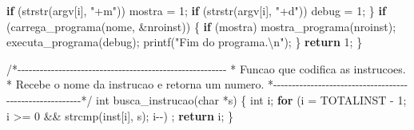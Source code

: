 \documentclass[
  brazilian,
  letterpaper,
]{book}
\newenvironment{Shaded}{\begin{snugshade}}{\end{snugshade}}
\newcommand{\CommentTok}[1]{\textcolor[rgb]{0.37,0.37,0.37}{#1}}
\newcommand{\ControlFlowTok}[1]{\textcolor[rgb]{0.00,0.23,0.31}{\textbf{#1}}}
\newcommand{\DataTypeTok}[1]{\textcolor[rgb]{0.68,0.00,0.00}{#1}}
\newcommand{\DecValTok}[1]{\textcolor[rgb]{0.68,0.00,0.00}{#1}}
\newcommand{\NormalTok}[1]{\textcolor[rgb]{0.00,0.23,0.31}{#1}}
\newcommand{\OperatorTok}[1]{\textcolor[rgb]{0.37,0.37,0.37}{#1}}
\newcommand{\SpecialCharTok}[1]{\textcolor[rgb]{0.37,0.37,0.37}{#1}}
\newcommand{\StringTok}[1]{\textcolor[rgb]{0.13,0.47,0.30}{#1}}
\theoremstyle{plain}
\theoremstyle{definition}
\theoremstyle{remark}
\begin{document}
\begin{Shaded}
\begin{Highlighting}[]
        \ControlFlowTok{if} \OperatorTok{(}\NormalTok{strstr}\OperatorTok{(}\NormalTok{argv}\OperatorTok{[}\NormalTok{i}\OperatorTok{],} \StringTok{"+m"}\OperatorTok{))}
\NormalTok{            mostra }\OperatorTok{=} \DecValTok{1}\OperatorTok{;}
        \ControlFlowTok{if} \OperatorTok{(}\NormalTok{strstr}\OperatorTok{(}\NormalTok{argv}\OperatorTok{[}\NormalTok{i}\OperatorTok{],} \StringTok{"+d"}\OperatorTok{))}
\NormalTok{            debug }\OperatorTok{=} \DecValTok{1}\OperatorTok{;}
    \OperatorTok{\}}
    \ControlFlowTok{if} \OperatorTok{(}\NormalTok{carrega\_programa}\OperatorTok{(}\NormalTok{nome}\OperatorTok{,} \OperatorTok{\&}\NormalTok{nroinst}\OperatorTok{))}
    \OperatorTok{\{}
        \ControlFlowTok{if} \OperatorTok{(}\NormalTok{mostra}\OperatorTok{)}
\NormalTok{            mostra\_programa}\OperatorTok{(}\NormalTok{nroinst}\OperatorTok{);}
\NormalTok{        executa\_programa}\OperatorTok{(}\NormalTok{debug}\OperatorTok{);}
\NormalTok{        printf}\OperatorTok{(}\StringTok{"Fim do programa.}\SpecialCharTok{\textbackslash{}n}\StringTok{"}\OperatorTok{);}
    \OperatorTok{\}}
    \ControlFlowTok{return} \DecValTok{1}\OperatorTok{;}
\OperatorTok{\}}

\CommentTok{/*{-}{-}{-}{-}{-}{-}{-}{-}{-}{-}{-}{-}{-}{-}{-}{-}{-}{-}{-}{-}{-}{-}{-}{-}{-}{-}{-}{-}{-}{-}{-}{-}{-}{-}{-}{-}{-}{-}{-}{-}{-}{-}{-}{-}{-}{-}{-}{-}{-}{-}{-}{-}{-}{-}{-}{-}}
\CommentTok{ * Funcao que codifica as instrucoes.}
\CommentTok{ * Recebe o nome da instrucao e retorna um numero.}
\CommentTok{ *{-}{-}{-}{-}{-}{-}{-}{-}{-}{-}{-}{-}{-}{-}{-}{-}{-}{-}{-}{-}{-}{-}{-}{-}{-}{-}{-}{-}{-}{-}{-}{-}{-}{-}{-}{-}{-}{-}{-}{-}{-}{-}{-}{-}{-}{-}{-}{-}{-}{-}{-}{-}{-}{-}{-}{-}*/}
\DataTypeTok{int}\NormalTok{ busca\_instrucao}\OperatorTok{(}\DataTypeTok{char} \OperatorTok{*}\NormalTok{s}\OperatorTok{)}
\OperatorTok{\{}
    \DataTypeTok{int}\NormalTok{ i}\OperatorTok{;}
    \ControlFlowTok{for} \OperatorTok{(}\NormalTok{i }\OperatorTok{=}\NormalTok{ TOTALINST }\OperatorTok{{-}} \DecValTok{1}\OperatorTok{;}\NormalTok{ i }\OperatorTok{\textgreater{}=} \DecValTok{0} \OperatorTok{\&\&}\NormalTok{ strcmp}\OperatorTok{(}\NormalTok{inst}\OperatorTok{[}\NormalTok{i}\OperatorTok{],}\NormalTok{ s}\OperatorTok{);}\NormalTok{ i}\OperatorTok{{-}{-})}
        \OperatorTok{;}
    \ControlFlowTok{return}\NormalTok{ i}\OperatorTok{;}
\OperatorTok{\}}


\end{Highlighting}
\end{Shaded}
\end{document}
